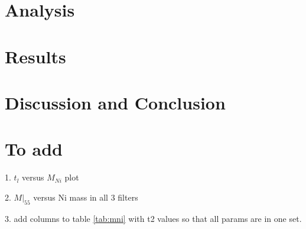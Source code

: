 \documentclass{aa}
\begin{document}
 
\iffalse
A summary of the 91~objects used in this work is shown in
Table~\ref{tab:sne_ref} where the phase range of observations
(first and last observation), total number of observations in each
filter and the reference for each data set are tabulated. Twelve of these SNe\,Ia
have been discussed by \citet{BN12} and have data only near the first
maximum. We also include IR photometry from two recent nearby
explosions, SN2011fe and SN2014J. The sample however, is dominated by objects
from the CSP. Hence, in section~\ref{sec-LC}, we divide the sample
into CSP and non-CSP objects. It is worth noting that there are 15 SNe\,Ia
with observed IR light curves beyond 100 days.

As can be seen in Table~\ref{tab:sne_ref} and displayed in
Figure~\ref{fig:lc1}the $K$ light curves are sparsely sampled  and
not enough objects are available for detailed analysis. We therefore 
disregard the $K$ light curves in the following as there is no
statistically significant sample available at this time.

In determining the  
minimum and second maximum, we required $\geq$4
observations at late phases ($>$7 days for the minimum and $>$15 days
for the second maximum) to constrain a spline fit. Only a subset
of the data could be used for the analysis at late times.
\fi
\section{Analysis}
\label{sec-ana}


\section{Results}
\label{sec-res}


\section{Discussion and Conclusion}
\label{sec-dnc}

\section{To add}
1. $t_l$ versus $M_{Ni}$ plot


2. $M|_{55}$ versus Ni mass in all 3 filters


3. add columns to table \ref{tab:mni} with t2 values so that all params are in one set.
\end{document}

